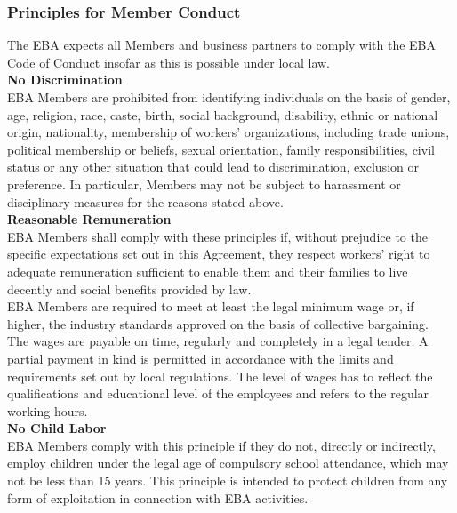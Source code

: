 \documentclass{article}
\begin{document}
\subsubsection{Principles for Member Conduct}

The EBA expects all Members and business partners to comply with the EBA Code of Conduct insofar as this is possible under local law. \\

\textbf{No Discrimination} \\

EBA Members are prohibited from identifying individuals on the basis of gender, age, religion, race, caste, birth, social background, disability, ethnic or national origin, nationality, membership of workers' organizations, including trade unions, political membership or beliefs, sexual orientation, family responsibilities, civil status or any other situation that could lead to discrimination, exclusion or preference. 
In particular, Members may not be subject to harassment or disciplinary measures for the reasons stated above. \\

\textbf{Reasonable Remuneration} \\

EBA Members shall comply with these principles if, without prejudice to the specific expectations set out in this Agreement, they respect workers' right to adequate remuneration sufficient to enable them and their families to live decently and social benefits provided by law. \\
EBA Members are required to meet at least the legal minimum wage or, if higher, the industry standards approved on the basis of collective bargaining. \\
The wages are payable on time, regularly and completely in a legal tender. 
A partial payment in kind is permitted in accordance with the limits and requirements set out by local regulations. 
The level of wages has to reflect the qualifications and educational level of the employees and refers to the regular working hours. \\

\textbf{No Child Labor} \\

EBA Members comply with this principle if they do not, directly or indirectly, employ children under the legal age of compulsory school attendance, which may not be less than 15 years. 
This principle is intended to protect children from any form of exploitation in connection with EBA activities. \\
\end{document}
